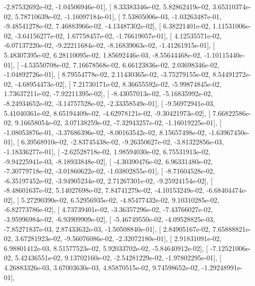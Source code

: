 \documentclass{article}
\begin{document}
         -2.87532692e-02,  -1.04506946e-01],
       [  8.33383346e-02,   5.82862419e-02,   3.65310374e-02,
          5.78710639e-02,  -1.16097184e-01],
       [  7.53805006e-03,  -1.03263487e-01,  -9.48541278e-02,
          7.46883966e-02,  -4.13487302e-02],
       [  6.38221401e-02,   1.11531006e-02,  -3.64156277e-02,
          1.67758457e-02,  -1.76619057e-01],
       [  4.12535571e-02,  -6.07137220e-02,  -9.22211684e-02,
         -8.16839063e-02,  -1.41261915e-01],
       [  5.48307395e-02,   6.28110095e-02,   1.85692446e-03,
         -8.55644468e-02,  -1.10115440e-01],
       [ -4.53550708e-02,   7.16678568e-02,   6.66123836e-02,
          2.03698346e-02,  -1.04892726e-01],
       [  8.79554778e-02,   2.11430365e-02,  -3.75279155e-02,
          8.54491272e-02,  -4.68954473e-02],
       [  7.21730171e-02,   8.36655592e-02,  -5.99874845e-02,
          1.73637211e-02,  -7.92211395e-02],
       [ -8.43057013e-02,  -5.16835992e-02,  -8.24934652e-02,
         -3.14757528e-02,  -2.33358549e-01],
       [ -9.56972941e-03,   5.41040361e-02,   8.65194409e-02,
         -4.62978121e-02,  -9.30421973e-02],
       [  7.66822586e-02,   9.16658054e-02,   3.07138259e-02,
         -7.32943257e-02,  -1.16019225e-01],
       [ -1.08053876e-01,  -3.37686396e-02,  -8.00163542e-02,
          8.15657498e-02,  -1.63967450e-01],
       [  6.39568910e-02,  -2.83745438e-02,  -9.26350627e-02,
         -3.81322856e-03,  -1.18336277e-01],
       [ -2.62528718e-02,   1.98594030e-02,   6.75531913e-02,
         -9.94225941e-03,  -8.18933848e-02],
       [ -4.30390476e-02,   6.96331480e-02,  -7.30779718e-02,
         -3.01860622e-02,  -1.03802855e-01],
       [ -8.71604528e-02,  -6.35197452e-02,  -3.94905234e-02,
          2.71267301e-02,  -9.25924154e-02],
       [ -8.48601637e-02,   5.14027698e-02,   7.84741279e-02,
         -4.10153249e-02,  -6.68404474e-02],
       [  5.27290390e-02,   6.52956935e-02,  -4.85477432e-02,
          9.10310285e-02,  -6.82773786e-02],
       [  4.73739401e-02,  -3.36357296e-02,  -7.43766027e-02,
         -3.95996984e-02,  -6.93909909e-02],
       [ -5.46749550e-02,  -4.09528825e-03,  -7.85271837e-03,
          2.87433632e-03,  -1.50508840e-01],
       [  2.84905167e-02,   7.65888821e-02,   3.67281923e-02,
         -9.56076086e-02,  -2.32072180e-01],
       [  2.91831091e-02,   6.98801412e-03,   8.51577523e-02,
          5.92033702e-02,  -5.84640912e-02],
       [ -7.12521006e-02,   5.42436551e-02,   9.13702160e-02,
         -2.54281229e-02,  -1.97802295e-01],
       [  4.26883326e-03,   3.67003630e-03,   4.85870515e-02,
          9.74598652e-02,  -1.29248991e-01],
\end{document}
